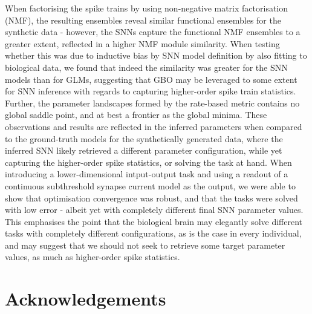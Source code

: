 \documentclass[mphil,deptreport,ianc]{infthesis} %
\begin{document}
\begin{preliminary}
{    When factorising the spike trains by using non-negative matrix factorisation (NMF), the resulting ensembles reveal similar functional ensembles for the synthetic data - however, the SNNs capture the functional NMF ensembles to a greater extent, reflected in a higher NMF module similarity.
    When testing whether this was due to inductive bias by SNN model definition by also fitting to biological data, we found that indeed the similarity was greater for the SNN models than for GLMs, suggesting that GBO may be leveraged to some extent for SNN inference with regards to capturing higher-order spike train statistics.
    Further, the parameter landscapes formed by the rate-based metric contains no global saddle point, and at best a frontier as the global minima.
    These observations and results are reflected in the inferred parameters when compared to the ground-truth models for the synthetically generated data, where the inferred SNN likely retrieved a different parameter configuration, while yet capturing the higher-order spike statistics, or solving the task at hand.
    When introducing a lower-dimensional intput-output task and using a readout of a continuous subthreshold synapse current model as the output, we were able to show that optimisation convergence was robust, and that the tasks were solved with low error - albeit yet with completely different final SNN parameter values.
    This emphasises the point that the biological brain may elegantly solve different tasks with completely different configurations, as is the case in every individual, and may suggest that we should not seek to retrieve some target parameter values, as much as higher-order spike statistics.
}

\maketitle

\section*{Acknowledgements}


\end{preliminary}
\end{document}
